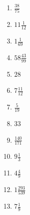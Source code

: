 \documentclass[12pt]{article}
\begin{document}
\begin{enumerate}
\item $ \frac{38}{75} $
\item $ 11 \frac{1}{12} $
\item $ 1 \frac{1}{69} $
\item $ 58 \frac{43}{99} $
\item $ 28 $
\item $ 7 \frac{11}{12} $
\item $ \frac{5}{19} $
\item $ 33 $
\item $ \frac{140}{171} $
\item $ 9 \frac{1}{3} $
\item $ 4 \frac{4}{9} $
\item $ 1 \frac{293}{539} $
\item $ 7 \frac{1}{9} $
\end{enumerate}
\newpage
\end{document}
